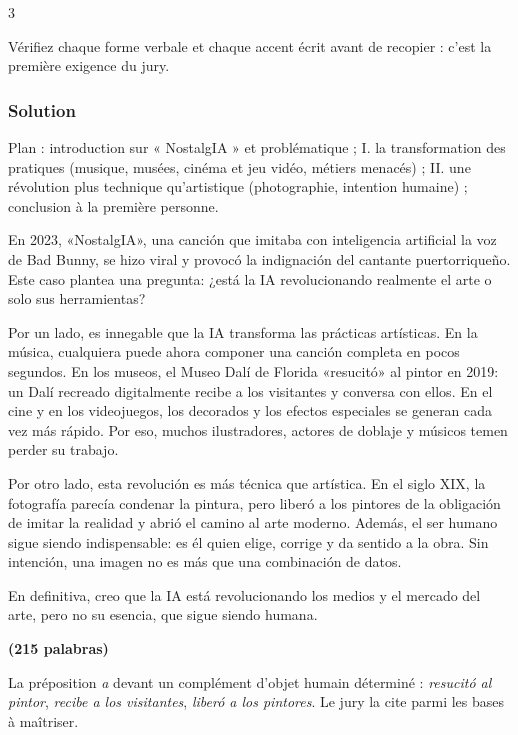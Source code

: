 \documentclass[11pt,a4paper]{article}
\begin{document}
\begin{indication}{3}

Vérifiez chaque forme verbale et chaque accent écrit avant de recopier : c'est la première exigence du jury.

\end{indication}

\hypertarget{solution-7}{%
\subsubsection{Solution}\label{solution-7}}

Plan : introduction sur « NostalgIA » et problématique ; I. la transformation des pratiques (musique, musées, cinéma et jeu vidéo, métiers menacés) ; II. une révolution plus technique qu'artistique (photographie, intention humaine) ; conclusion à la première personne.

En 2023, «NostalgIA», una canción que imitaba con inteligencia artificial la voz de Bad Bunny, se hizo viral y provocó la indignación del cantante puertorriqueño. Este caso plantea una pregunta: ¿está la IA revolucionando realmente el arte o solo sus herramientas?

Por un lado, es innegable que la IA transforma las prácticas artísticas. En la música, cualquiera puede ahora componer una canción completa en pocos segundos. En los museos, el Museo Dalí de Florida «resucitó» al pintor en 2019: un Dalí recreado digitalmente recibe a los visitantes y conversa con ellos. En el cine y en los videojuegos, los decorados y los efectos especiales se generan cada vez más rápido. Por eso, muchos ilustradores, actores de doblaje y músicos temen perder su trabajo.

Por otro lado, esta revolución es más técnica que artística. En el siglo XIX, la fotografía parecía condenar la pintura, pero liberó a los pintores de la obligación de imitar la realidad y abrió el camino al arte moderno. Además, el ser humano sigue siendo indispensable: es él quien elige, corrige y da sentido a la obra. Sin intención, una imagen no es más que una combinación de datos.

En definitiva, creo que la IA está revolucionando los medios y el mercado del arte, pero no su esencia, que sigue siendo humana.

\textbf{(215 palabras)}

\begin{methode}

La préposition \emph{a} devant un complément d'objet humain déterminé : \emph{resucitó al pintor}, \emph{recibe a los visitantes}, \emph{liberó a los pintores}. Le jury la cite parmi les bases à maîtriser.

\end{methode}
\end{document}
